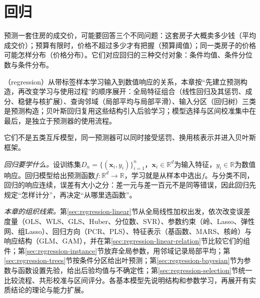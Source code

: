 \chapter{回归}
\label{chap:regression}

预测一套住房的成交价，可能要回答三个不同问题：这套房子大概卖多少钱（平均成交价）；预算有限时，价格不超过多少才有把握（预算阈值）；同一类房子的价格可能怎样分布（价格分布）。它们对应回归的三种交付对象：条件均值、条件分位数与条件分布。

（regression）从带标签样本学习输入到数值响应的关系，本章按“先建立预测构造，再改变学习与使用过程”的顺序展开：全局特征组合（线性回归及其惩罚、成分、稳健与核扩展）、查询邻域（局部平均与局部平滑）、输入分区（回归树）三类是预测构造；贝叶斯回归复用这些结构引入后验学习；模型选择与区间校准集中在最后，是独立于预测器的使用流程。

它们不是五类互斥模型，同一预测器可以同时接受惩罚、换用核表示并进入贝叶斯框架。

\emph{回归要学什么。}设训练集$D_n=\{(\bm{x}_i,y_i)\}_{i=1}^n$，$\bm{x}_i\in\mathbb{R}^d$为输入特征，$y_i\in\mathbb{R}$为数值响应。回归模型给出预测函数$f:\mathbb{R}^d\to\mathbb{R}$，学习就是从样本中选出$f$。与分类不同，回归的响应连续，误差有大小之分：差一元与差一百元不是同等错误，因此回归先规定“怎样计分”，再决定“从哪里选函数”。

\emph{本章的组织线索。}第\ref{sec:regression-linear}节从全局线性加权出发，依次改变误差度量（OLS、WLS、GLS、Huber、分位数、SVR）、参数约束（岭、Lasso、弹性网、组Lasso）、回归方向（PCR、PLS）、特征表示（基函数、MARS、核岭）与响应结构（GLM、GAM），并在第\ref{sec:regression-linear-relation}节比较它们的组件；第\ref{sec:regression-instance}节放弃全局参数，用邻域记录局部平均；第\ref{sec:regression-trees}节按条件分区给出叶预测；第\ref{sec:regression-bayesian}节为参数与函数设置先验，给出后验均值与不确定性；第\ref{sec:regression-selection}节统一比较流程、共形校准与区间评分。各基本模型先说明结构和参数学习，再展开有实质结论的理论与能力扩展。





















